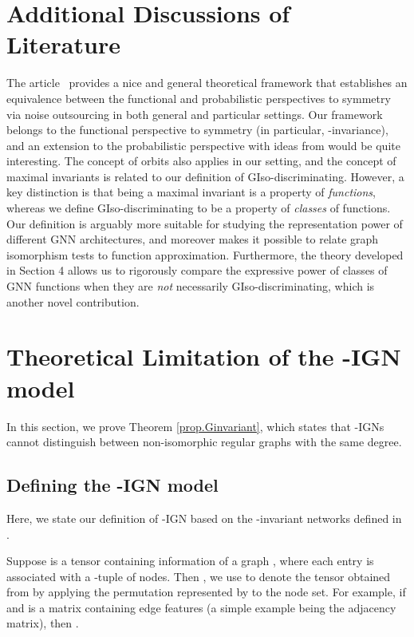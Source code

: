 \documentclass{article}
\begin{document}
\section{Additional Discussions of Literature}
\label{app.probabilistic}
The article~\cite{bloemreddy2019probabilistic} provides a nice and general theoretical framework that establishes an equivalence between the functional and probabilistic perspectives to symmetry via noise outsourcing in both general and particular settings. Our framework belongs to the functional perspective to symmetry (in particular, -invariance), and an extension to the probabilistic perspective with ideas from \cite{bloemreddy2019probabilistic} would be quite interesting. The concept of orbits also applies in our setting, and the concept of maximal invariants is related to our definition of GIso-discriminating. However, a key distinction is that being a maximal invariant is a property of \emph{functions}, whereas we define GIso-discriminating to be a property of \textit{classes} of functions. Our definition is arguably more suitable for studying the representation power of different GNN architectures, and moreover makes it possible to relate graph isomorphism tests to function approximation. Furthermore, the theory developed in Section 4 allows us to rigorously compare the expressive power of classes of GNN functions when they are \emph{not} necessarily GIso-discriminating, which is another novel contribution.




\section{Theoretical Limitation of the -IGN model} \label{app.Ginvariant}
\label{order_2_G_inv}

In this section, we prove Theorem \ref{prop.Ginvariant}, which states that -IGNs cannot distinguish between non-isomorphic regular graphs with the same degree.

\subsection{Defining the -IGN model}
\label{app:2ign}
Here, we state our definition of -IGN based on the -invariant networks defined in \cite{maron2019universality}.

Suppose  is a tensor containing information of a graph , where each entry is associated with a -tuple of nodes. Then , we use  to denote the  tensor obtained from  by applying the permutation represented by  to the node set. For example, if  and  is a matrix containing edge features (a simple example being the adjacency matrix), then .
\end{document}
